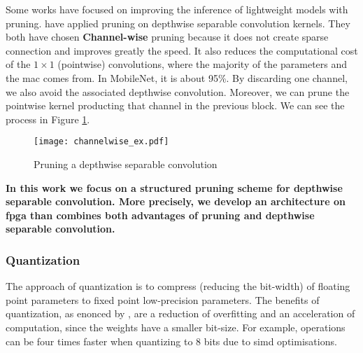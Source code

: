 %
Some works have focused on improving the inference of lightweight models with pruning. \textcite{zhang_channel_2019, tu_pruning_2019} have applied pruning on depthwise separable convolution kernels. They both have chosen \textbf{Channel-wise} pruning because it does not create sparse connection and improves greatly the speed. It also reduces the computational cost of the $1 \times 1$ (pointwise) convolutions, where the majority of the parameters and the \acrshort{mac} comes from. In MobileNet, it is about 95\%. By discarding one channel, we also avoid the associated depthwise convolution.
Moreover, we can prune the pointwise kernel producting that channel in the previous block. We can see the process in Figure \ref{fig:pruning_dsc}.
%
\begin{figure}
    \centering
    \texttt{[image: channelwise\_ex.pdf]}
    \caption{Pruning a depthwise separable convolution \cite{tu_pruning_2019}}
    \label{fig:pruning_dsc}
\end{figure}

\textbf{In this work we focus on a structured pruning scheme for depthwise separable convolution. More precisely, we develop an architecture on \acrshort{fpga} than combines both advantages of pruning and depthwise separable convolution.}
%
%
\subsubsection{Quantization} \label{subs:quantization}
The approach of quantization is to compress (reducing the bit-width) of floating point parameters to fixed point low-precision parameters. The benefits of quantization, as enonced by \cite{joos_de_ter_beerst_accelerating_2019}, are a reduction of overfitting and an acceleration of computation, since the weights have a smaller bit-size. For example, operations can be four times faster when quantizing to 8 bits due to \acrshort{simd} optimisations.

